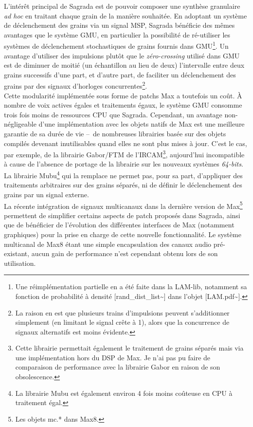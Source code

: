 \noindent L'intérêt principal de Sagrada est de pouvoir composer une synthèse granulaire \textit{ad hoc} en traitant chaque grain de la manière souhaitée. En adoptant un système de déclenchement des grains via un signal \gls{MSP}, Sagrada bénéficie des mêmes avantages que le système \gls{GMU}, en particulier la possibilité de ré-utiliser les systèmes de déclenchement stochastiques de grains fournis dans \gls{GMU}\footnote{Une réimplémentation partielle en a été faite dans la LAM-lib, notamment sa fonction de probabilité à densité [rand\_dist\_list\textasciitilde{}] dans l'objet [LAM.pdf\textasciitilde{}].}. Un avantage d'utiliser des impulsions plutôt que le \textit{zéro-crossing} utilisé dans \gls{GMU} est de diminuer de moitié (un échantillon au lieu de deux) l'intervalle entre deux grains successifs d'une part, et d'autre part, de faciliter un déclenchement des grains par des signaux d'horloges concurrentes\footnote{La raison en est que plusieurs trains d'impulsions peuvent s'additionner simplement (en limitant le signal crête à 1), alors que la concurrence de signaux alternatifs est moins évidente.}.\\
\indent Cette modularité implémentée sous forme de patchs Max a toutefois un coût. À nombre de voix actives égales et traitements égaux, le système \gls{GMU} consomme trois fois moins de ressources \gls{CPU} que Sagrada. Cependant, un avantage non-négligeable d'une implémentation avec les objets natifs de Max est une meilleure garantie de sa durée de vie --~de nombreuses librairies basée sur des objets compilés devenant inutilisables quand elles ne sont plus mises à jour. C'est le cas, par exemple, de la librairie Gabor/FTM de l'\gls{IRCAM}\footnote{Cette librairie permettait également le traitement de grains séparés mais via une implémentation hors du \gls{DSP} de Max. Je n'ai pas pu faire de comparaison de performance avec la librairie Gabor en raison de son obsolescence.}, aujourd'hui incompatible à cause de l'absence de portage de la librairie sur les nouveaux systèmes \textit{64-bits}. La librairie Mubu\footnote{La librairie Mubu est également environ 4 fois moins coûteuse en \gls{CPU} à traitement égal.} qui la remplace ne permet pas, pour sa part, d'appliquer des traitements arbitraires sur des grains séparés, ni de définir le déclenchement des grains par un signal externe.\\
\indent La récente intégration de signaux multicanaux dans la dernière version de Max\footnote{Les objets mc.* dans Max8.} permettent de simplifier certains aspects de patch proposés dans Sagrada, ainsi que de bénéficier de l'évolution des différentes interfaces de Max (notamment graphiques) pour la prise en charge de cette nouvelle fonctionnalité. Le système multicanal de Max8 étant une simple encapsulation des canaux audio pré-existant, aucun gain de performance n'est cependant obtenu lors de son utilisation.\\

